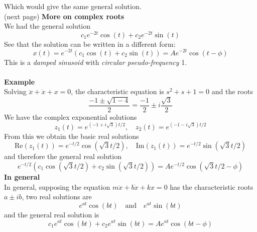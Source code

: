 \documentclass{report}
\begin{document}
Which would give the same general solution.\\
(next page)
\newpage
\noindent\textbf{More on complex roots}\\
We had the general solution
\begin{equation*}
c_1e^{-2t}\cos(t)+c_2e^{-2t}\sin(t)
\end{equation*}
See that the solution can be written in a different form:
\begin{equation*}
x(t)=e^{-2t}(c_1\cos(t)+c_2\sin(t))=Ae^{-2t}\cos(t-\phi)
\end{equation*}
This is a \textit{damped sinusoid} with \textit{circular pseudo-frequency} 1.\\
\vspace{1mm}\\
\textbf{Example}\\
Solving $\ddot{x}+\dot{x}+x=0$, the characteristic equation is $s^2+s+1=0$ and the roots
\begin{equation*}
\frac{-1\pm\sqrt{1-4}}{2}=\frac{-1}{2}\pm i\frac{\sqrt{3}}{2}
\end{equation*}
We have the complex exponential solutions
\begin{equation*}
z_1(t)=e^{(-1+i\sqrt{3})t/2},\quad z_2(t)=e^{(-1-i\sqrt{3})t/2} 
\end{equation*}
From this we obtain the basic real solutions
\begin{equation*}
\text{Re}(z_1(t))=e^{-t/2}\cos(\sqrt{3}t/2),\quad
\text{Im}(z_1(t))=e^{-t/2}\sin(\sqrt{3}t/2)
\end{equation*}
and therefore the general real solution
\begin{equation*}
e^{-t/2}(c_1\cos(\sqrt{3}t/2)+c_2\sin(\sqrt{3}t/2))
=Ae^{-t/2}\cos(\sqrt{3}t/2-\phi)
\end{equation*}
\textbf{In general}\\
In general, supposing the equation $m\ddot{x}+b\dot{x}+kx=0$ has the characteristic roots
$a\pm ib$, two real solutions are
\begin{equation*}
e^{at}\cos(bt)\quad\text{and}\quad e^{at}\sin(bt)
\end{equation*}
and the general real solution is
\begin{equation*}
c_1e^{at}\cos(bt)+c_2e^{at}\sin(bt)=Ae^{at}\cos(bt-\phi)
\end{equation*}
\newpage
\end{document}
